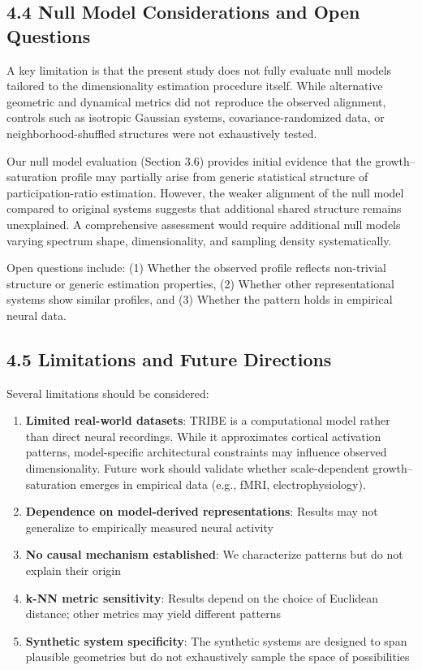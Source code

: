 \subsection{4.4 Null Model Considerations and Open Questions}

A key limitation is that the present study does not fully evaluate null models tailored to the dimensionality estimation procedure itself. While alternative geometric and dynamical metrics did not reproduce the observed alignment, controls such as isotropic Gaussian systems, covariance-randomized data, or neighborhood-shuffled structures were not exhaustively tested.

Our null model evaluation (Section 3.6) provides initial evidence that the growth--saturation profile may partially arise from generic statistical structure of participation-ratio estimation. However, the weaker alignment of the null model compared to original systems suggests that additional shared structure remains unexplained. A comprehensive assessment would require additional null models varying spectrum shape, dimensionality, and sampling density systematically.

Open questions include: (1) Whether the observed profile reflects non-trivial structure or generic estimation properties, (2) Whether other representational systems show similar profiles, and (3) Whether the pattern holds in empirical neural data.

\subsection{4.5 Limitations and Future Directions}

Several limitations should be considered:

\begin{enumerate}
	\item \textbf{Limited real-world datasets}: TRIBE is a computational model rather than direct neural recordings. While it approximates cortical activation patterns, model-specific architectural constraints may influence observed dimensionality. Future work should validate whether scale-dependent growth--saturation emerges in empirical data (e.g., fMRI, electrophysiology).

	\item \textbf{Dependence on model-derived representations}: Results may not generalize to empirically measured neural activity \citep{Galletti2001}

	\item \textbf{No causal mechanism established}: We characterize patterns but do not explain their origin

	\item \textbf{k-NN metric sensitivity}: Results depend on the choice of Euclidean distance; other metrics may yield different patterns

	\item \textbf{Synthetic system specificity}: The synthetic systems are designed to span plausible geometries but do not exhaustively sample the space of possibilities
\end{enumerate}

